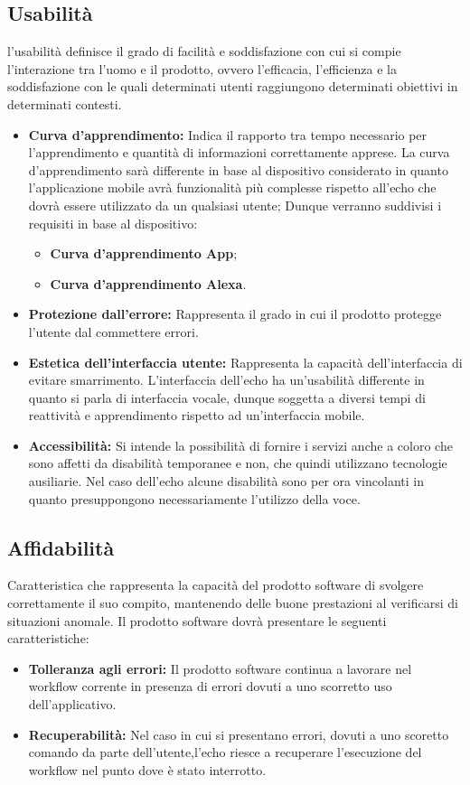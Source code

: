 \subsection{Usabilità}
l'usabilità definisce il grado di facilità e soddisfazione con cui si compie l'interazione tra l'uomo e il prodotto, ovvero l'efficacia, l'efficienza e la soddisfazione con le quali determinati utenti raggiungono determinati obiettivi in determinati contesti.
\begin{itemize}
	\item \textbf{Curva d'apprendimento:} Indica il rapporto tra tempo necessario per l'apprendimento e quantità di informazioni correttamente apprese.
	La curva d'apprendimento sarà differente in base al dispositivo considerato in quanto l'applicazione mobile avrà funzionalità più complesse rispetto all'echo che dovrà essere utilizzato da un qualsiasi utente;
	Dunque verranno suddivisi i requisiti in base al dispositivo:
	\begin{itemize}
		\item \textbf{Curva d'apprendimento App};
		\item \textbf{Curva d'apprendimento Alexa}.
	\end{itemize}
	\item \textbf{Protezione dall'errore:} Rappresenta il grado in cui il prodotto protegge l'utente dal commettere errori.
	\item \textbf{Estetica dell'interfaccia utente:} Rappresenta la capacità dell'interfaccia di evitare smarrimento.
	L'interfaccia dell'echo ha un'usabilità differente  in quanto si parla di interfaccia vocale, dunque soggetta a diversi tempi di reattività e apprendimento rispetto ad un'interfaccia mobile.
	\item \textbf{Accessibilità:}  Si intende la possibilità di fornire i servizi anche a coloro che sono affetti da disabilità temporanee e non, che quindi utilizzano tecnologie ausiliarie.
	Nel caso dell'echo alcune disabilità sono per ora vincolanti in quanto presuppongono necessariamente l'utilizzo della voce.
\end{itemize}
\subsection{Affidabilità}
Caratteristica che rappresenta la capacità del prodotto software di svolgere correttamente il suo compito, mantenendo delle buone prestazioni al verificarsi di situazioni anomale. 
Il prodotto software dovrà presentare le seguenti caratteristiche:
\begin{itemize}
	\item \textbf{Tolleranza agli errori:} Il prodotto software continua a lavorare nel workflow corrente in presenza di errori dovuti a uno scorretto uso dell'applicativo.
	\item \textbf{Recuperabilità:} Nel caso in cui si presentano errori, dovuti a uno scoretto comando da parte dell'utente,l'echo riesce a recuperare l'esecuzione  del workflow nel punto dove è stato interrotto.
\end{itemize}
